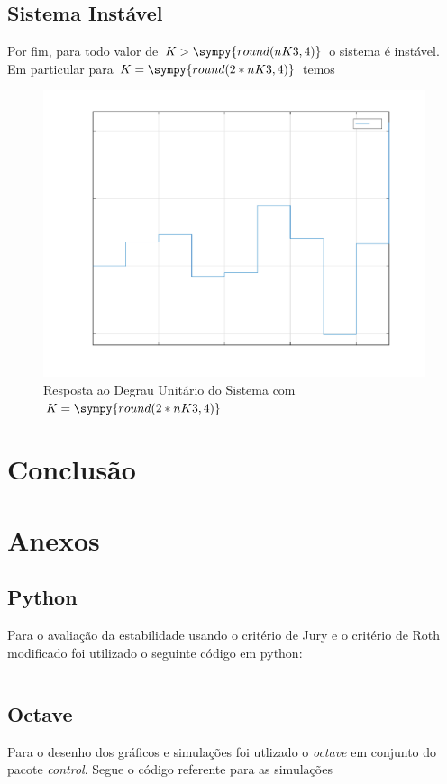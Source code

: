 \documentclass[a4paper,11pt]{article}
\newcommand{\npy}[1]{\sympy{round(#1,4)}}
\begin{document}
\subsection{Sistema Instável}

Por fim, para todo valor de $K > \npy{nK3}$ o sistema é instável. Em particular para $K = \npy{2*nK3}$ temos

\begin{figure}[H]
    \centering
    \includegraphics[width=0.8\linewidth]{img/exsim1-plot-instable-inc.pdf}
    \caption{Resposta ao Degrau Unitário do Sistema com $K = \npy{2*nK3}$}
\end{figure}


\section{Conclusão}







\section{Anexos}
\subsection{Python}

Para o avaliação da estabilidade usando o critério de Jury e o critério de Roth modificado foi utilizado o seguinte código em python:

\inputminted{matlab}{../python/exsim1.py}

\subsection{Octave}

Para o desenho dos gráficos e simulações foi utlizado o \textit{octave} em conjunto do pacote \textit{control}. Segue o código referente para as simulações

\inputminted{matlab}{../matlab/exsim1.m}


\end{document}
